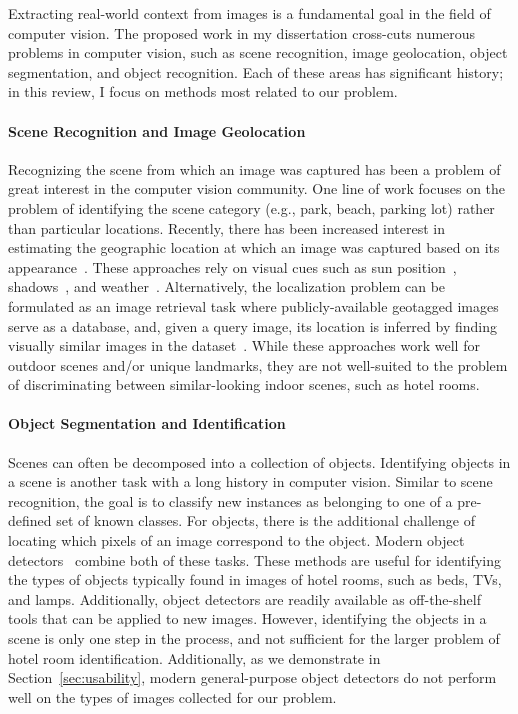 \documentclass[12pt]{article}
\begin{document}
Extracting real-world context from images is a fundamental goal in the field of computer vision. The proposed work in my dissertation cross-cuts numerous problems in computer vision, such as scene recognition, image geolocation, object segmentation, and object recognition. Each of these areas has significant history; in this review, I focus on methods most related to our problem.

\paragraph{Scene Recognition and Image Geolocation}
Recognizing the scene from which an image was captured has been a problem of great interest in the computer vision community. One line of work focuses on the problem of identifying the scene category (e.g., park, beach, parking lot) rather than particular locations. Recently, there has been increased interest in estimating the geographic location at which an image was captured based on its
appearance~\cite{baatz2012large,doersch2012what,hays2008im2gps,knopp2010avoiding,li2009landmark,zhou2014recognizing}. These approaches rely on visual cues such as sun
position~\cite{cozman1995robot,lalonde2010sun,workman2014rainbow}, shadows~\cite{junejo2010gps,sandnes2011determining,wu2010geo}, and weather~\cite{jacobs11geolocate,jacobs08geoorient,sunkavalli2008color}. Alternatively, the localization problem can be formulated as an image retrieval task where publicly-available geotagged images serve as a database, and, given a query image,  its location is inferred by finding visually similar images in the dataset~\cite{baatz2012large,chen2011city,crandall2009mapping,hays2008im2gps,jacobs07geolocate,schindler2007city,torii2013visual,zamir2010accurate,zhou2014recognizing}. While these approaches work well for outdoor scenes and/or unique landmarks, they are not well-suited to the problem of discriminating between similar-looking indoor scenes, such as hotel rooms.

\paragraph{Object Segmentation and Identification} Scenes can often be decomposed into a collection of objects. Identifying objects in a scene is another task with a long history in computer vision. Similar to scene recognition, the goal is to classify new instances as belonging to one of a pre-defined set of known classes. For objects, there is the additional challenge of locating which pixels of an image correspond to the object. Modern object detectors~\cite{DBLP:journals/corr/LiuAESR15,yolov3,DBLP:journals/corr/RenHG015} combine both of these tasks. These methods are useful for identifying the types of objects typically found in images of hotel rooms, such as beds, TVs, and lamps. Additionally, object detectors are readily available as off-the-shelf tools that can be applied to new images. However, identifying the objects in a scene is only one step in the process, and not sufficient for the larger problem of hotel room identification. Additionally, as we demonstrate in Section~\ref{sec:usability}, modern general-purpose object detectors do not perform well on the types of images collected for our problem.
\end{document}
